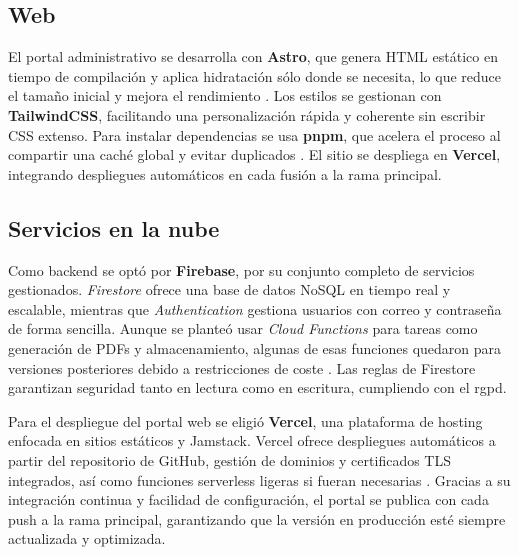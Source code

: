 \subsection{Web}

\begin{large}

El portal administrativo se desarrolla con \textbf{Astro}, que genera HTML estático en tiempo de compilación y aplica hidratación sólo donde se necesita, lo que reduce el tamaño inicial y mejora el rendimiento \cite{astro_docs2025}. Los estilos se gestionan con \textbf{TailwindCSS}, facilitando una personalización rápida y coherente sin escribir CSS extenso. Para instalar dependencias se usa \textbf{pnpm}, que acelera el proceso al compartir una caché global y evitar duplicados \cite{pnpm_docs2025}. El sitio se despliega en \textbf{Vercel}, integrando despliegues automáticos en cada fusión a la rama principal.

\end{large}

\subsection{Servicios en la nube}

\begin{large}

Como backend se optó por \textbf{Firebase}, por su conjunto completo de servicios gestionados. \textit{Firestore} ofrece una base de datos NoSQL en tiempo real y escalable, mientras que \textit{Authentication} gestiona usuarios con correo y contraseña de forma sencilla. Aunque se planteó usar \textit{Cloud Functions} para tareas como generación de PDFs y almacenamiento, algunas de esas funciones quedaron para versiones posteriores debido a restricciones de coste \cite{firebase_docs2025}. Las reglas de Firestore garantizan seguridad tanto en lectura como en escritura, cumpliendo con el \gls{rgpd}.

Para el despliegue del portal web se eligió \textbf{Vercel}, una plataforma de hosting enfocada en sitios estáticos y Jamstack. Vercel ofrece despliegues automáticos a partir del repositorio de GitHub, gestión de dominios y certificados TLS integrados, así como funciones serverless ligeras si fueran necesarias \cite{vercel_docs2025}. Gracias a su integración continua y facilidad de configuración, el portal se publica con cada push a la rama principal, garantizando que la versión en producción esté siempre actualizada y optimizada.

\end{large}

